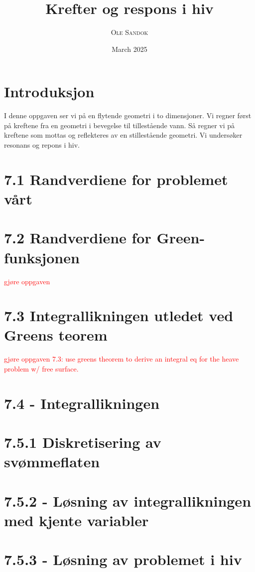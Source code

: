 \documentclass{article}
\title{Krefter og respons i hiv}
\subtitle{\textit{\headcourse}}
\author{\textsc{Ole Sandok}}
\date{March 2025} %
\begin{document}
\maketitle
\thispagestyle{fancy} 

\section{Introduksjon}
I denne oppgaven ser vi på en flytende geometri i to dimensjoner. Vi regner først på kreftene fra en geometri i bevegelse til tillestående vann. Så regner vi på kreftene som mottas og reflekteres av en stillestående geometri. Vi undersøker resonans og repons i hiv. 

\section{7.1 Randverdiene for problemet vårt}


\section{7.2 Randverdiene for Green-funksjonen}

\textcolor{red}{gjøre oppgaven}

\section{7.3 Integrallikningen utledet ved Greens teorem}

\textcolor{red}{gjøre oppgaven 7.3: use greens theorem to derive an integral eq for the heave problem w/ free surface.}
\section{7.4 - Integrallikningen} 

\section{7.5.1 Diskretisering av svømmeflaten} 

\section{7.5.2 - Løsning av integrallikningen med kjente variabler}
 
\textcolor{red}{}
\section{7.5.3 - Løsning av problemet i hiv}

\end{document}
